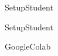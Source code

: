 \documentclass[opener-c,labs,black,nociteref]{HJnewsiambook}
\begin{document}

\newif\ifbyu      %
\newif\ifwindows  %
\newif\ifbootcamp %

\byutrue

\bootcamptrue   

\windowstrue

{SetupStudent}

\windowsfalse
{SetupStudent}


\begin{appendices} 
{GoogleColab}
\end{appendices}
\end{document}
